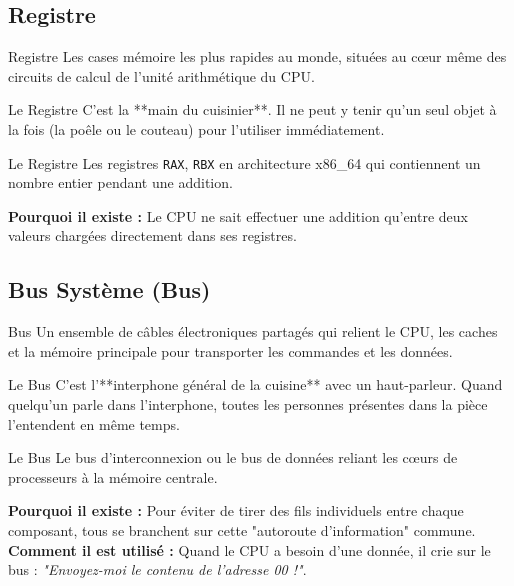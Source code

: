 \documentclass[12pt,a4paper]{article}
\begin{document}
\subsection{Registre}
\begin{definitionbox}{Registre}
Les cases mémoire les plus rapides au monde, situées au cœur même des circuits de calcul de l'unité arithmétique du CPU.
\end{definitionbox}

\begin{analogybox}{Le Registre}
C'est la **main du cuisinier**. Il ne peut y tenir qu'un seul objet à la fois (la poêle ou le couteau) pour l'utiliser immédiatement.
\end{analogybox}

\begin{examplebox}{Le Registre}
Les registres \texttt{RAX}, \texttt{RBX} en architecture x86\_64 qui contiennent un nombre entier pendant une addition.
\end{examplebox}
\textbf{Pourquoi il existe :} Le CPU ne sait effectuer une addition qu'entre deux valeurs chargées directement dans ses registres.

\subsection{Bus Système (Bus)}
\begin{definitionbox}{Bus}
Un ensemble de câbles électroniques partagés qui relient le CPU, les caches et la mémoire principale pour transporter les commandes et les données.
\end{definitionbox}

\begin{analogybox}{Le Bus}
C'est l'**interphone général de la cuisine** avec un haut-parleur. Quand quelqu'un parle dans l'interphone, toutes les personnes présentes dans la pièce l'entendent en même temps.
\end{analogybox}

\begin{examplebox}{Le Bus}
Le bus d'interconnexion ou le bus de données reliant les cœurs de processeurs à la mémoire centrale.
\end{examplebox}
\textbf{Pourquoi il existe :} Pour éviter de tirer des fils individuels entre chaque composant, tous se branchent sur cette "autoroute d'information" commune.\\
\textbf{Comment il est utilisé :} Quand le CPU a besoin d'une donnée, il crie sur le bus : \textit{"Envoyez-moi le contenu de l'adresse 00 !"}.
\end{document}
